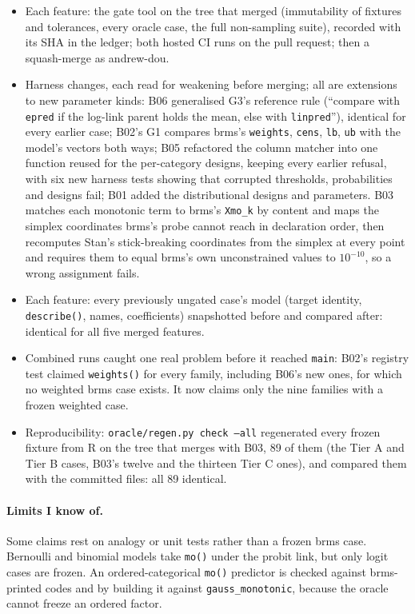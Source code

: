 \documentclass[11pt]{article}
\newcommand{\code}[1]{\texttt{#1}}
\begin{document}
\begin{itemize}
\item Each feature: the gate tool on the tree that merged (immutability of fixtures and tolerances, every
  oracle case, the full non-sampling suite), recorded with its SHA in the ledger; both hosted CI runs on the pull
  request; then a squash-merge as andrew-dou.
\item Harness changes, each read for weakening before merging; all are extensions to new parameter kinds:
  B06 generalised G3's reference rule (``compare with \code{epred} if the log-link parent holds the mean, else with
  \code{linpred}''), identical for every earlier case; B02's G1 compares brms's \code{weights}, \code{cens},
  \code{lb}, \code{ub} with the model's vectors both ways; B05 refactored the column matcher into one function reused
  for the per-category designs, keeping every earlier refusal, with six new harness tests showing that corrupted
  thresholds, probabilities and designs fail; B01 added the distributional designs and parameters.
  B03 matches each monotonic term to brms's \code{Xmo\_k} by content and maps the simplex coordinates brms's probe
  cannot reach in declaration order, then recomputes Stan's stick-breaking coordinates from the simplex at every point
  and requires them to equal brms's own unconstrained values to $10^{-10}$, so a wrong assignment fails.
\item Each feature: every previously ungated case's model (target identity, \code{describe()}, names, coefficients)
  snapshotted before and compared after: identical for all five merged features.
\item Combined runs caught one real problem before it reached \code{main}: B02's registry test claimed
  \code{weights()} for every family, including B06's new ones, for which no weighted brms case exists. It now claims
  only the nine families with a frozen weighted case.
\item Reproducibility: \code{oracle/regen.py check --all} regenerated every frozen fixture from R on the
  tree that merges with B03, 89 of them (the Tier A and Tier B cases, B03's twelve and the thirteen Tier C ones),
  and compared them with the committed files: all 89 identical.
\end{itemize}

\paragraph{Limits I know of.} Some claims rest on analogy or unit tests rather than a frozen brms case. Bernoulli and
binomial models take \code{mo()} under the probit link, but only logit cases are frozen. An ordered-categorical
\code{mo()} predictor is checked against brms-printed codes and by building it against \code{gauss\_monotonic}, because
the oracle cannot freeze an ordered factor.
\end{document}
